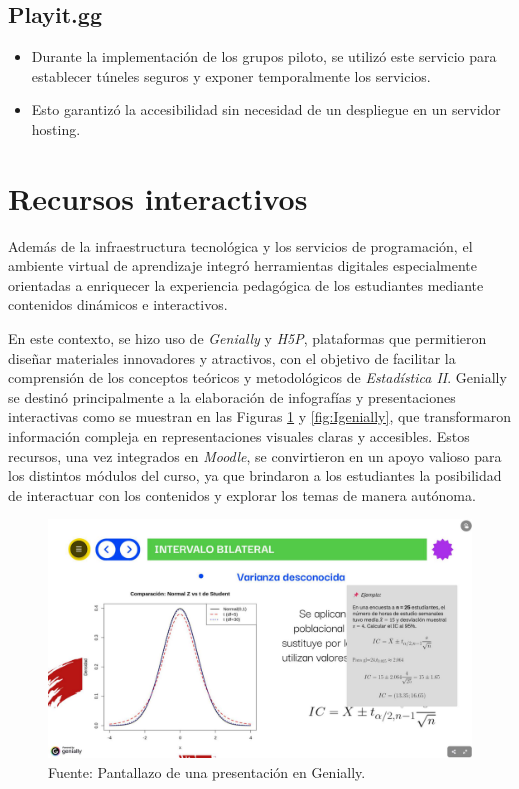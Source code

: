 \documentclass[letter,oneside,12pt,spanish]{report}
\begin{document}
\subsection{Playit.gg}
\begin{itemize}
    \item Durante la implementación de los grupos piloto, se utilizó este servicio para establecer túneles seguros y exponer temporalmente los servicios.
    \item Esto garantizó la accesibilidad sin necesidad de un despliegue en un servidor hosting.
\end{itemize}

\section{Recursos interactivos}

Además de la infraestructura tecnológica y los servicios de programación, el ambiente virtual de aprendizaje integró herramientas digitales especialmente orientadas a enriquecer la experiencia pedagógica de los estudiantes mediante contenidos dinámicos e interactivos.

En este contexto, se hizo uso de \textit{Genially} y \textit{H5P}, plataformas que permitieron diseñar materiales innovadores y atractivos, con el objetivo de facilitar la comprensión de los conceptos teóricos y metodológicos de \textit{Estadística II}. Genially se destinó principalmente a la elaboración de infografías y presentaciones interactivas como se muestran en las Figuras \ref{fig:Pgenially} y \ref{fig:Igenially}, que transformaron información compleja en representaciones visuales claras y accesibles. Estos recursos, una vez integrados en \textit{Moodle}, se convirtieron en un apoyo valioso para los distintos módulos del curso, ya que brindaron a los estudiantes la posibilidad de interactuar con los contenidos y explorar los temas de manera autónoma.

\begin{figure}[ht]
	\centering
	\includegraphics[width=1\textwidth]{Figs/Presentacion_Genially.pdf}
	\label{fig:Pgenially}
	\\Fuente: Pantallazo de una presentación en Genially.
\end{figure}
\end{document}
